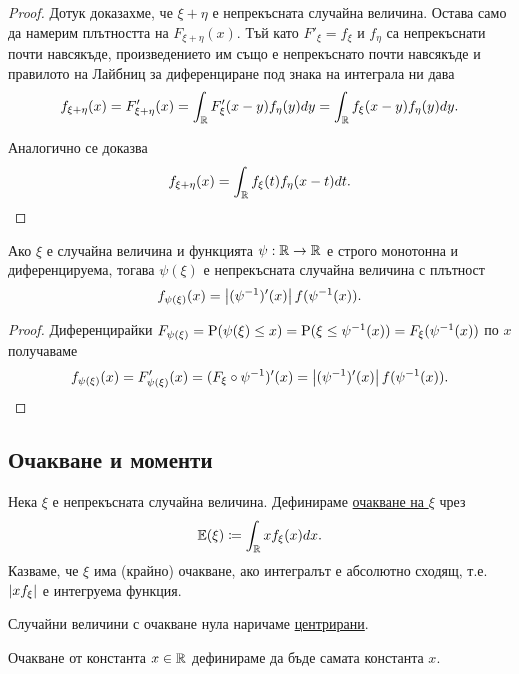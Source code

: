 \documentclass[numbers=endperiod, DIV=15, bibliography=totocnumbered]{scrartcl}
\begin{document}
\begin{proof}
  Дотук доказахме, че $\xi + \eta$ е непрекъсната случайна величина. Остава само да намерим плътността на $F_{\xi + \eta}(x)$. Тъй като $F'_\xi = f_\xi$ и $f_\eta$ са непрекъснати почти навсякъде, произведението им също е непрекъснато почти навсякъде и правилото на Лайбниц за диференциране под знака на интеграла ни дава
  \begin{displaymath}
    f_{\xi + \eta} (x)
    =
    F'_{\xi + \eta} (x)
    =
    \int_{\mathbb{R}} F'_\xi(x - y) f_\eta(y) dy
    =
    \int_{\mathbb{R}} f_\xi(x - y) f_\eta(y) dy.
  \end{displaymath}

  Аналогично се доказва
  \begin{displaymath}
    f_{\xi + \eta} (x)
    =
    \int_{\mathbb{R}} f_\xi(t) f_\eta(x - t) dt.
  \end{displaymath}
\end{proof}

\begin{proposition}\label{thm:transformation-density}
  Ако $\xi$ е случайна величина и функцията $\psi: \mathbb{R} \to \mathbb{R}$ е строго монотонна и диференцируема, тогава $\psi(\xi)$ е непрекъсната случайна величина с плътност
  \begin{displaymath}
    f_{\psi(\xi)} (x)
    =
    \left\vert (\psi^{-1})'(x) \right\vert f(\psi^{-1}(x)).
  \end{displaymath}
\end{proposition}
\begin{proof} Диференцирайки $F_{\psi(\xi)} = \operatorname{P}(\psi(\xi) \leq x) = \operatorname{P}(\xi \leq \psi^{-1}(x)) = F_\xi(\psi^{-1}(x))$ по $x$ получаваме
  \begin{displaymath}
    f_{\psi(\xi)} (x)
    =
    F'_{\psi(\xi)} (x)
    =
    (F_{\xi} \circ \psi^{-1})'(x)
    =
    \left\vert (\psi^{-1})'(x) \right\vert f(\psi^{-1}(x)).
  \end{displaymath}
\end{proof}

\subsection{Очакване и моменти}

\begin{definition}
  Нека $\xi$ е непрекъсната случайна величина. Дефинираме \uline{очакване на $\xi$} чрез
  \begin{displaymath}
    \mathbb{E}(\xi) \coloneqq \int_{\mathbb{R}} x f_\xi(x) dx.
  \end{displaymath}
  Казваме, че $\xi$ има (крайно) очакване, ако интегралът е абсолютно сходящ, т.е. $\left\vert x f_\xi \right\vert$ е интегруема функция.

  Случайни величини с очакване нула наричаме \uline{центрирани}.

  Очакване от константа $x \in \mathbb{R}$ дефинираме да бъде самата константа $x$.
\end{definition}
\end{document}
